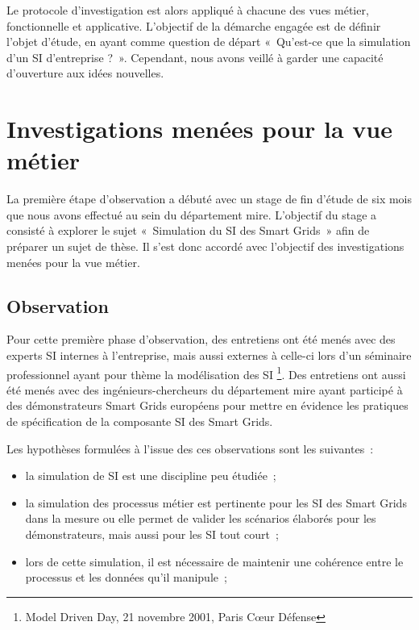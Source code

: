 Le protocole d'investigation est alors appliqué à chacune des vues métier, 
fonctionnelle et applicative. L'objectif de la démarche engagée est de définir 
l'objet d'étude, en ayant comme question de départ «~Qu'est-ce que la simulation 
d'un SI d'entreprise ?~». Cependant, nous avons veillé à garder une capacité 
d'ouverture aux idées nouvelles. %
	
\section{Investigations menées pour la vue métier}
\label{sec:exploration_metier}
La première étape d'observation a débuté avec un stage de fin d'étude de six 
mois que nous avons effectué au sein du département \gls{mire}. L'objectif du 
stage a consisté à explorer le sujet «~Simulation du SI des Smart Grids~» afin 
de préparer un sujet de thèse. Il s'est donc accordé avec l'objectif des 
investigations menées pour la vue métier.
			
\subsection{Observation}
Pour cette première phase d'observation, des entretiens ont été menés avec 
des experts SI internes à l'entreprise, mais aussi externes à celle-ci lors 
d'un séminaire professionnel ayant pour thème la modélisation des SI \footnote{Model Driven Day, 21 novembre 2001, Paris 
Cœur Défense}. Des entretiens ont aussi été menés avec des ingénieurs-chercheurs 
du département \gls{mire} ayant participé à des démonstrateurs Smart Grids 
européens pour mettre en évidence les pratiques de spécification de la 
composante SI des Smart Grids. 

Les hypothèses formulées à l'issue des ces observations sont les suivantes~:
\begin{itemize}
    \item la simulation de SI est une discipline peu étudiée~;
	\item la simulation des processus métier est pertinente pour les SI des 
Smart Grids dans la mesure ou elle permet de valider les scénarios élaborés pour 
les démonstrateurs, mais aussi pour les SI tout court~;
	\item lors de cette simulation, il est nécessaire de maintenir une 
cohérence entre le processus et les données qu'il manipule~;
\end{itemize}
		
